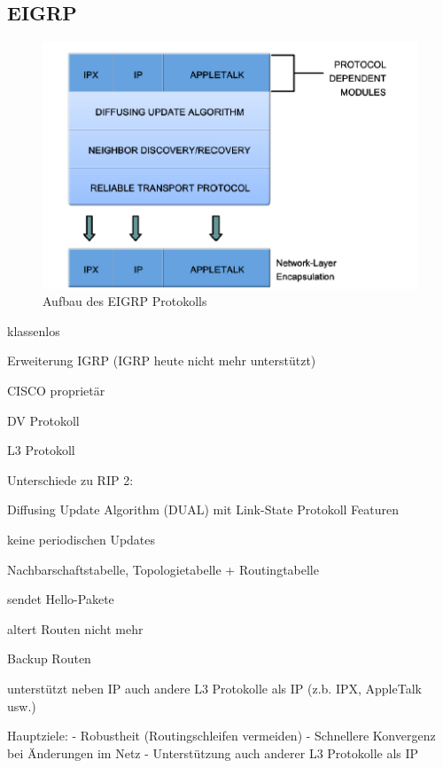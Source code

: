 \documentclass[11pt,a4paper]{article}
\begin{document}
\subsection{EIGRP}

\begin{figure}[h]
\begin{center}
	\includegraphics[scale=1]{img/EIGRP-Aufbau.png}
	\caption{Aufbau des EIGRP Protokolls}
	\label{a:label}
\end{center}	
\end{figure}

\begin{list}{-}{}
\item{klassenlos}
\item{Erweiterung IGRP (IGRP heute nicht mehr unterstützt)}
\item{CISCO proprietär}
\item{DV Protokoll}
\item{L3 Protokoll}
\end{list}


Unterschiede zu RIP 2:
\begin{list}{-}{}
\item{Diffusing Update Algorithm (DUAL) mit Link-State Protokoll Featuren}
\item{keine periodischen Updates}
\item{Nachbarschaftstabelle, Topologietabelle + Routingtabelle}
\item{sendet Hello-Pakete}
\item{altert Routen nicht mehr}
\item{Backup Routen}
\item{unterstützt neben IP auch andere L3 Protokolle als IP (z.b. IPX, 
AppleTalk usw.)}
\end{list}


Hauptziele:
- Robustheit (Routingschleifen vermeiden)
- Schnellere Konvergenz bei Änderungen im Netz
- Unterstützung auch anderer L3 Protokolle als IP
\end{document}
